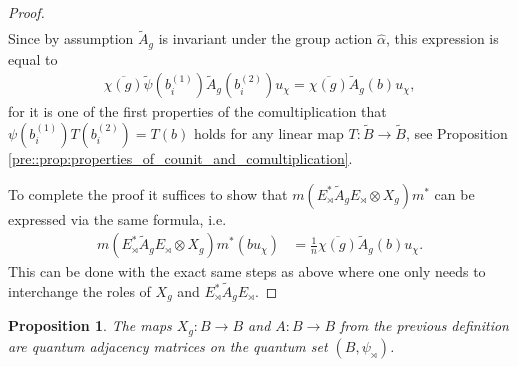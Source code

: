 \documentclass{amsart}
\newtheorem{proposition}[thm]{Proposition}
\theoremstyle{definition}
\theoremstyle{definition}
\begin{document}
\begin{proof}
\begin{align*}
    \end{align*}
    Since by assumption $\tilde{A}_g$ is invariant under the group action $\hat{\alpha}$, this expression is equal to 
    \begin{align*}
        \overline{\chi(g)} \tilde{\psi}(b_i^{(1)}) \tilde{A}_g(b_i^{(2)}) u_\chi
            = \overline{\chi(g)} \tilde{A}_g(b) u_\chi,
    \end{align*}
    for it is one of the first properties of the comultiplication that $\psi(b_i^{(1)}) T(b_i^{(2)}) = T(b)$ holds for any linear map $T: \tilde{B} \to \tilde{B}$, see Proposition \ref{pre::prop:properties_of_counit_and_comultiplication}.

    To complete the proof it suffices to show that $m(E_\rtimes^\ast \tilde{A}_g E_\rtimes \otimes X_g) m^\ast$ can be expressed via the same formula, i.e.
    \begin{align*}
        m(E_\rtimes^\ast \tilde{A}_g E_\rtimes \otimes X_g) m^\ast (b u_\chi) 
            &= \frac{1}{n} \overline{\chi(g)} \tilde{A}_g(b) u_\chi.
    \end{align*}
    This can be done with the exact same steps as above where one only needs to interchange the roles of $X_g$ and $E_\rtimes^\ast \tilde{A}_g E_\rtimes$.
\end{proof}

\begin{proposition}
    \label{der::prop:derived_graph_is_quantum_graph}
    The maps $X_g: B \to B$ and $A: B \to B$ from the previous definition are quantum adjacency matrices on the quantum set $(B, \psi_\rtimes)$.
\end{proposition}
\end{document}
